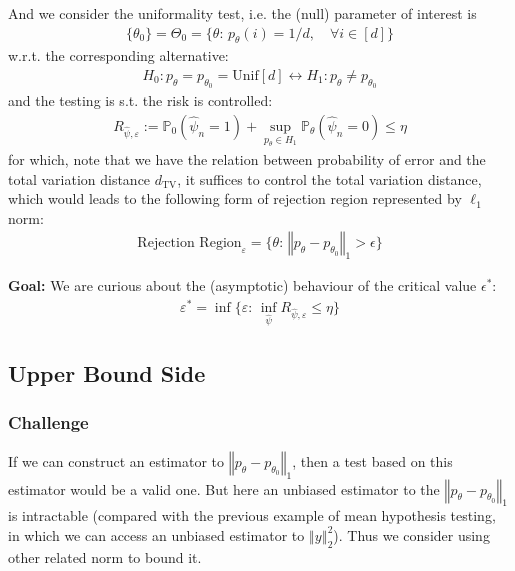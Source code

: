 \documentclass[twoside,12pt]{article}
\begin{document}
And we consider the uniformality test, i.e. the (null) parameter of interest is 
\begin{align*}
   \{\theta _0\} = \Theta _0 = \big\{\theta :\, p_\theta (i) = 1/d,\quad \forall i\in [d]\big\} 
\end{align*}
w.r.t. the corresponding alternative:
\begin{align*}
   H_0: p_\theta = p_{\theta _0}=\mathrm{ Unif }[d]  \longleftrightarrow H_1:p_\theta \neq p_{\theta _0}
\end{align*}
and the testing is s.t. the risk is controlled:
\begin{align*}
   R_{\hat{\psi},\varepsilon }:=\mathbb{P}_0\left( \hat{\psi}_n=1 \right) +
    \mathop{ \sup }\limits_{p_\theta \in H_1} \mathbb{P}_\theta \left( \hat{\psi}_n = 0 \right)  \leq \eta 
\end{align*}
for which, note that we have the relation between probability of error and the total variation distance $ d_\mathrm{ TV }  $, it suffices to control the total variation distance, which would leads to the following form of rejection region represented by $ \ell_1 $ norm:
\begin{align*}
   \text{Rejection Region}_\varepsilon  = \big\{ \theta :\, \left\Vert p_\theta -p_{\theta _0}  \right\Vert  _1 >\epsilon \big\}
\end{align*}

\textbf{Goal:} We are curious about the (asymptotic) behaviour of the critical value $ \epsilon^*  $:
\begin{align*}
   \varepsilon ^* = \mathop{ \inf }\{\varepsilon :\, \inf_{\hat{\psi}}R_{\hat{\psi},\varepsilon }\leq \eta  \}
\end{align*}










\subsection{Upper Bound Side}

\subsubsection{Challenge}

If we can construct an estimator to $ \left\Vert p_\theta -p_{\theta _0} \right\Vert _1 $, then a test based on this estimator would be a valid one. But here an unbiased estimator to the $ \left\Vert p_\theta -p_{\theta _0}  \right\Vert  _1 $ is intractable (compared with the previous example of mean hypothesis testing, in which we can access an unbiased estimator to $ \left\Vert y   \right\Vert _2^2 $). Thus we consider using other related norm to bound it.
\end{document}
